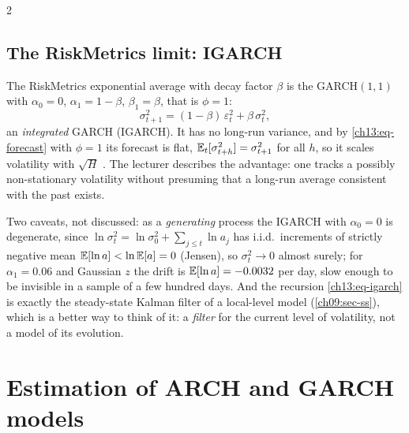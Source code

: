 \begin{paracol}{2}
\subsection{The RiskMetrics limit: IGARCH}\label{ch13:sec-igarch}
The RiskMetrics exponential average with decay factor $\beta$ is the GARCH$(1,1)$ with $\alpha_0=0$, $\alpha_1=1-\beta$, $\beta_1=\beta$, that is $\phi=1$:
\begin{equation}\label{ch13:eq-igarch}
  \sigma_{t+1}^2=(1-\beta)\,\varepsilon_t^2+\beta\,\sigma_t^2,
\end{equation}
an \emph{integrated} GARCH (IGARCH). It has no long-run variance, and by \eqref{ch13:eq-forecast} with $\phi=1$ its forecast is flat, $\mathbb{E}_t[\sigma^2_{t+h}]=\sigma^2_{t+1}$ for all $h$, so it scales volatility with $\sqrt H$
. The lecturer describes the advantage: one tracks a possibly non-stationary volatility without presuming that a long-run average consistent with the past exists.
\begin{secondary}
Two caveats, not
discussed: as a \emph{generating} process the IGARCH with $\alpha_0=0$ is degenerate, since $\ln\sigma_t^2=\ln\sigma_0^2+\sum_{j\le t}\ln a_j$ has i.i.d.\ increments of strictly negative mean
$\mathbb{E}[\ln a]<\ln\mathbb{E}[a]=0$ (Jensen), so $\sigma_t^2\to0$ almost surely; for $\alpha_1=0.06$ and Gaussian $z$ the drift is $\mathbb{E}[\ln a]=-0.0032$ per day, slow enough to be invisible in a sample of a few hundred days. And the
recursion \eqref{ch13:eq-igarch} is exactly the steady-state Kalman filter of a local-level model (\cref{ch09:sec-ss}), which is a better way to think of it: a \emph{filter} for the current level of volatility, not a
model of its evolution.
\end{secondary}


\section{Estimation of ARCH and GARCH models}\label{ch13:sec-mle}


\end{paracol}
